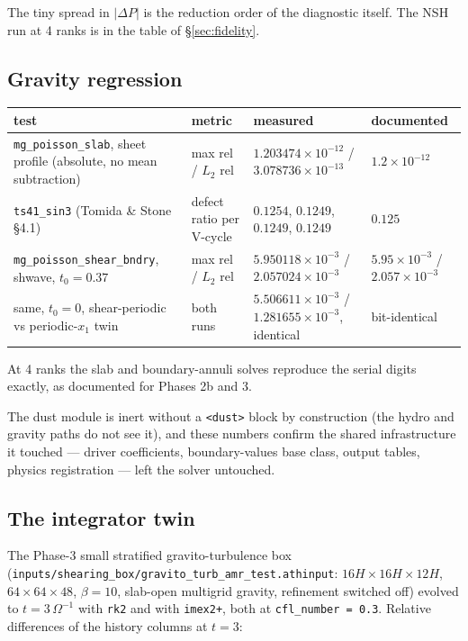 \documentclass[11pt]{article}
\newcommand{\code}[1]{\texttt{#1}}
\newcommand{\file}[1]{\texttt{#1}}
\newcommand{\Om}{\Omega}
\begin{document}
The tiny spread in $|\Delta P|$ is the reduction order of the diagnostic itself. The
NSH run at 4 ranks is in the table of \S\ref{sec:fidelity}.

\subsection{Gravity regression}
\label{sec:gravity}

\begin{center}
\small
\begin{tabular}{@{}>{\raggedright\arraybackslash}p{4.4cm}>{\raggedright\arraybackslash}p{2.6cm}>{\raggedright\arraybackslash}p{4.9cm}>{\raggedright\arraybackslash}p{3.3cm}@{}}
\toprule
test & metric & measured & documented \\
\midrule
\file{mg\_poisson\_slab}, sheet profile (absolute, no mean subtraction) & max rel / $L_2$ rel &
  $1.203474\times10^{-12}$ / $3.078736\times10^{-13}$ & $1.2\times10^{-12}$ \\
\file{ts41\_sin3} (Tomida \& Stone \S4.1) & defect ratio per V-cycle &
  $0.1254$, $0.1249$, $0.1249$, $0.1249$ & $0.125$ \\
\file{mg\_poisson\_shear\_bndry}, shwave, $t_0 = 0.37$ & max rel / $L_2$ rel &
  $5.950118\times10^{-3}$ / $2.057024\times10^{-3}$ & $5.95\times10^{-3}$ / $2.057\times10^{-3}$ \\
same, $t_0 = 0$, shear-periodic vs periodic-$x_1$ twin & both runs &
  $5.506611\times10^{-3}$ / $1.281655\times10^{-3}$, identical & bit-identical \\
\bottomrule
\end{tabular}
\end{center}

At 4 ranks the slab and boundary-annuli solves reproduce the serial digits exactly,
as documented for Phases 2b and 3.

The dust module is inert without a \code{<dust>} block by construction (the hydro
and gravity paths do not see it), and these numbers confirm the shared
infrastructure it touched --- driver coefficients, boundary-values base class,
output tables, physics registration --- left the solver untouched.

\subsection{The integrator twin}
\label{sec:twin}

The Phase-3 small stratified gravito-turbulence box
(\file{inputs/shearing\_box/gravito\_turb\_amr\_test.athinput}: $16H\times16H\times12H$,
$64\times64\times48$, $\beta = 10$, slab-open multigrid gravity, refinement switched off)
evolved to $t = 3\,\Om^{-1}$ with \code{rk2} and with \code{imex2+}, both at
\code{cfl\_number = 0.3}. Relative differences of the history columns at $t = 3$:
\end{document}
